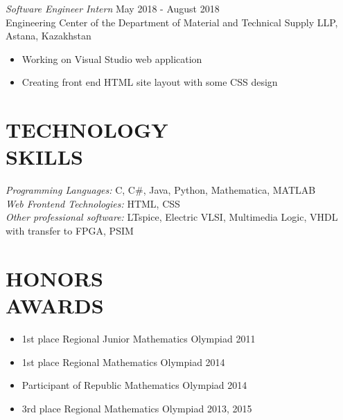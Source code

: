 \documentclass[margin, 10pt]{res} %
\begin{document}
\begin{resume}
{\sl Software Engineer Intern} \hfill May 2018 - August 2018 \\
Engineering Center of the Department of Material and Technical Supply LLP, Astana, Kazakhstan
\begin{itemize}
\item Working on Visual Studio web application
\item Creating front end HTML site layout with some CSS design
\end{itemize} 


\section{TECHNOLOGY \\ SKILLS} 

{\sl Programming Languages:} C, C\#, Java, Python, Mathematica, MATLAB \\
{\sl Web Frontend Technologies:} HTML, CSS  \\
{\sl Other professional software:}   LTspice, Electric VLSI, Multimedia Logic, VHDL with transfer to FPGA, PSIM
 

\section{HONORS \\ AWARDS}
\begin{itemize}
\item 1st place Regional Junior Mathematics Olympiad \hfill 2011 
\item 1st place Regional Mathematics Olympiad  \hfill 2014 
\item Participant of Republic Mathematics Olympiad \hfill 2014 
\item 3rd place Regional Mathematics Olympiad \hfill 2013, 2015 



\end{itemize}



\end{resume}
\end{document}
